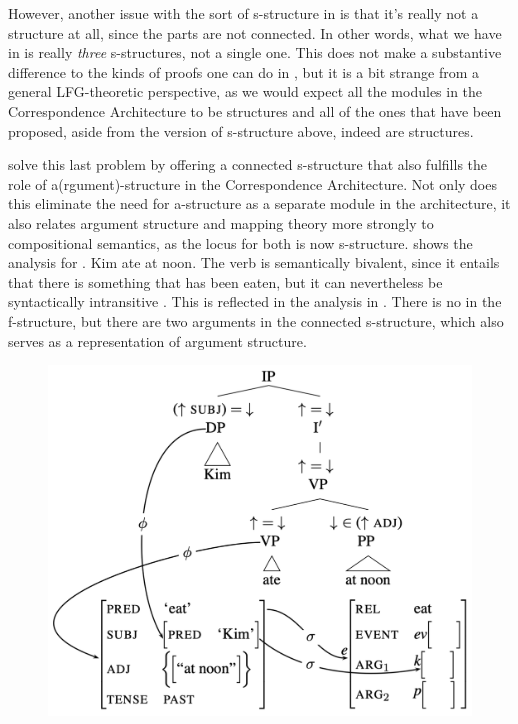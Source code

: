 \documentclass[output=paper,hidelinks]{langscibook}
\begin{document}
However, another issue with the sort of s-structure in
 is that it's really not a structure at all, since
the parts are not connected. In other words, what we have in
 is really \emph{three} s-structures, not a single
one. This does not make a substantive difference to the kinds of
proofs one can do in \glues, but it is a bit strange from a general
LFG-theoretic perspective, as we would expect all the modules in the
Correspondence Architecture to be structures and all of the ones that
have been proposed, aside from the version of s-structure above,
indeed are structures.

\citet{AsudGior12} solve this last problem by offering a
connected s-structure that also fulfills the role of
a(rgument)-structure \citep{butt1997architecture} in the Correspondence
Architecture. Not only does this eliminate the need for a-structure as
a separate module in the architecture, it also relates argument
structure and mapping theory more strongly to compositional semantics,
as the locus for both is now s-structure.  shows the
\citet{AsudGior12} analysis for .
\ea
\label{ex:eat-intrans} Kim ate at noon. 
\z
%
The verb  is semantically bivalent, since it entails that
there is something that has been eaten, but it can nevertheless be
syntactically intransitive \citep[71]{AsudGior12}. This is
reflected in the analysis in . There is no
 in the f-structure, but there are two arguments in the
connected s-structure, which also serves as a representation of
argument structure.  

\begin{figure}
  \centering
  \includegraphics[scale=.4]{figures/Glue/arg-struc1.png}
  \caption{\label{fig:ag-as}  \citep[72; used with permission]{AsudGior12}}
\end{figure}
\end{document}
